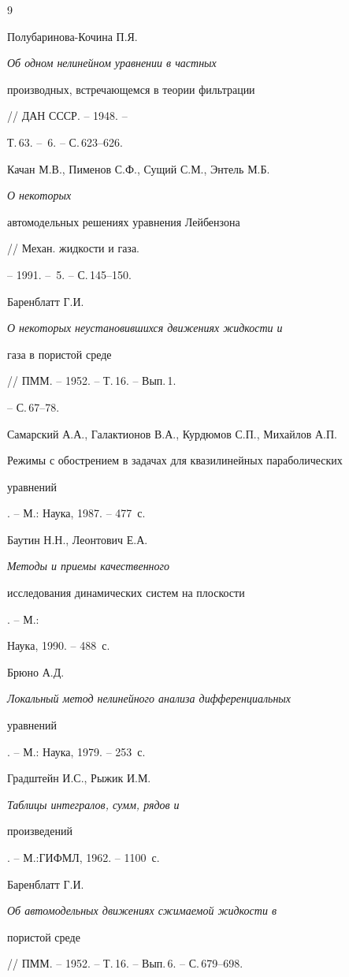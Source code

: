 \begin{thebibliography}{9} 


 




Полубаринова-Кочина П.Я. {\em Об одном нелинейном уравнении в частных 


производных, встречающемся в теории фильтрации} // ДАН СССР. -- 1948. -- 


Т.\,63. -- \No\,6. -- С.\,623--626. 




Качан М.В., Пименов С.Ф., Сущий С.М., Энтель М.Б. {\em О некоторых 


автомодельных решениях уравнения Лейбензона} // Механ. жидкости и газа. 


-- 1991. -- \No\,5. -- С.\,145--150. 




Баренблатт Г.И. {\em О некоторых неустановившихся движениях жидкости и 


газа в пористой среде} // ПММ. -- 1952. -- Т.\,16. -- Вып.\,1. 


-- С.\,67--78. 




Самарский А.А., Галактионов В.А., Курдюмов С.П., Михайлов А.П. {\em 


Режимы с обострением в задачах для квазилинейных параболических 


уравнений}. -- М.: Наука, 1987. -- 477~с. 




Баутин Н.Н., Леонтович Е.А. {\em Методы и приемы качественного 


исследования динамических систем на плоскости}. -- М.: 


Наука, 1990. -- 488~с. 




Брюно А.Д. {\em Локальный метод нелинейного анализа дифференциальных 


уравнений}. -- М.: Наука, 1979. -- 253~с. 




Градштейн И.С., Рыжик И.М. {\em Таблицы интегралов, сумм, рядов и 


произведений}. -- М.:\linebreak ГИФМЛ, 1962. -- 1100~с. 




Баренблатт Г.И. {\em Об автомодельных движениях сжимаемой жидкости в 


пористой среде} // ПММ. -- 1952. -- Т.\,16. -- Вып.\,6. -- С.\,679--698. 


 


\end{thebibliography} 


 


\vskip 2cm 


 






 


\label{end} 


 


